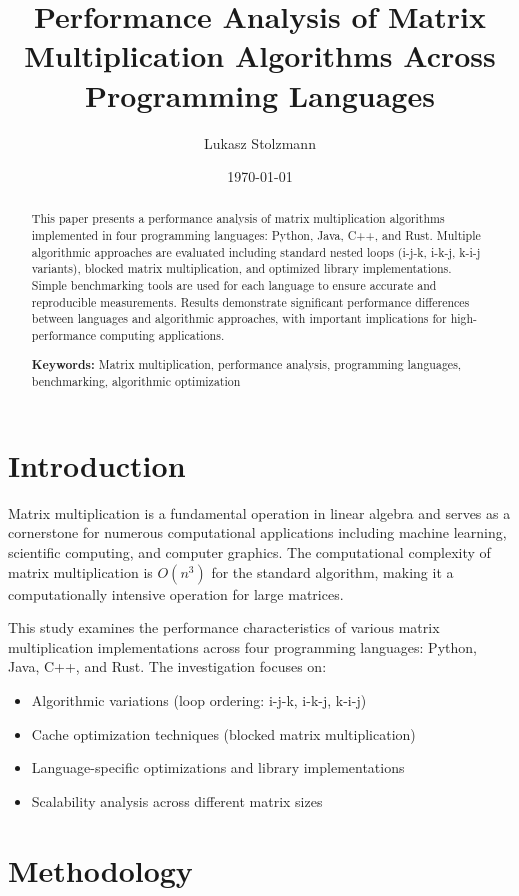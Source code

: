 \documentclass[11pt,a4paper]{article}
\title{Performance Analysis of Matrix Multiplication Algorithms Across Programming Languages}
\author{Lukasz Stolzmann}
\date{\today}
\begin{document}
\maketitle

\begin{abstract}
This paper presents a performance analysis of matrix multiplication algorithms implemented in four programming languages: Python, Java, C++, and Rust. Multiple algorithmic approaches are evaluated including standard nested loops (i-j-k, i-k-j, k-i-j variants), blocked matrix multiplication, and optimized library implementations. Simple benchmarking tools are used for each language to ensure accurate and reproducible measurements. Results demonstrate significant performance differences between languages and algorithmic approaches, with important implications for high-performance computing applications.

\textbf{Keywords:} Matrix multiplication, performance analysis, programming languages, benchmarking, algorithmic optimization
\end{abstract}

\section{Introduction}

Matrix multiplication is a fundamental operation in linear algebra and serves as a cornerstone for numerous computational applications including machine learning, scientific computing, and computer graphics. The computational complexity of matrix multiplication is $O(n^3)$ for the standard algorithm, making it a computationally intensive operation for large matrices.

This study examines the performance characteristics of various matrix multiplication implementations across four programming languages: Python, Java, C++, and Rust. The investigation focuses on:

\begin{itemize}
    \item Algorithmic variations (loop ordering: i-j-k, i-k-j, k-i-j)
    \item Cache optimization techniques (blocked matrix multiplication)
    \item Language-specific optimizations and library implementations
    \item Scalability analysis across different matrix sizes
\end{itemize}

\section{Methodology}
\end{document}
